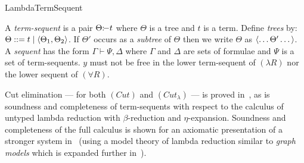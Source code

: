\begin{entry}{LambdaTermSequent}
\begin{clarifications}
A {\em term-sequent} is a pair $\Theta {{:}\!{-}} {t}$ where $\Theta$ is a tree and
${t}$ is a term. Define {\em trees} by: $\Theta::={t} \mid
\langle \Theta_1, \Theta_2\rangle$. If $\Theta'$ occurs as a {\em subtree} of $\Theta$ then
we write $\Theta$ as $\langle \dots\Theta'\dots\rangle$. A {\em sequent} has the form
$\Gamma \vdash \Psi, \Delta$ where $\Gamma$ and $\Delta$ are sets of formulae and
$\Psi$ is a set of term-sequents. ${y}$ must not be free in the lower
term-sequent of $(\lambda R)$ nor the lower sequent of $(\forall R)$.
\end{clarifications}

\begin{technicalities}
Cut elimination --- for both $(Cut)$ and $(Cut_{\lambda})$ --- is proved
in~\cite{mgabbay:lambdacut}, as is soundness and completeness of term-sequents
with respect to the calculus of untyped lambda reduction with $\beta$-reduction
and $\eta$-expansion. Soundness and completeness of the full calculus is shown
for an axiomatic presentation of a stronger system in~\cite{gabbay:simcks}
(using a model theory of lambda reduction similar to {\em graph models} which is
expanded further in~\cite{gabbay:simcmt,Gabbay2016}).
\end{technicalities}

\end{entry} 
